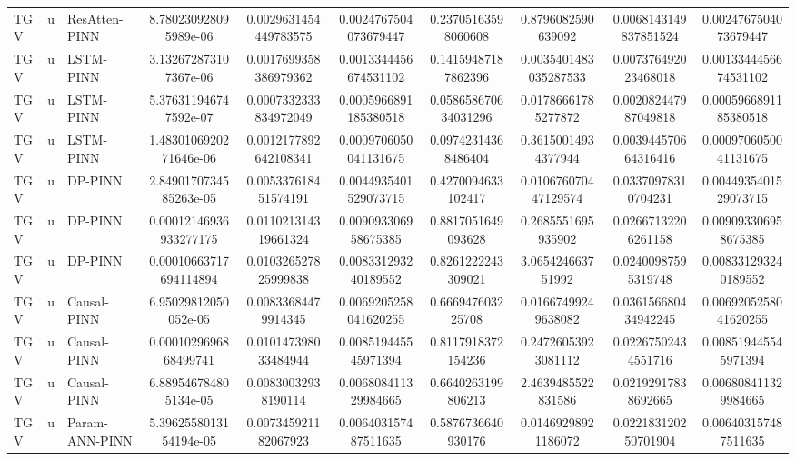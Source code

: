 \begin{landscape}
\begin{longtable}{lllccccccc}
 TGV &     u &  ResAtten-PINN &  8.780230928095989e-06 &  0.0029631454449783575 &  0.0024767504073679447 &  0.23705163598060608 &    0.8796082590639092 & 0.0068143149837851524 &  0.0024767504073679447 \\
 TGV &     u &      LSTM-PINN &  3.132672873107367e-06 &  0.0017699358386979362 &  0.0013344456674531102 &  0.14159487187862396 & 0.0035401483035287533 &  0.007376492023468018 &  0.0013344456674531102 \\
 TGV &     u &      LSTM-PINN &  5.376311946747592e-07 &  0.0007332333834972049 &  0.0005966891185380518 & 0.058658670634031296 &   0.01786661785277872 &  0.002082447987049818 &  0.0005966891185380518 \\
 TGV &     u &      LSTM-PINN & 1.4830106920271646e-06 &  0.0012177892642108341 &  0.0009706050041131675 &  0.09742314368486404 &   0.36150014934377944 &  0.003944570664316416 &  0.0009706050041131675 \\
 TGV &     u &        DP-PINN & 2.8490170734585263e-05 &   0.005337618451574191 &  0.0044935401529073715 &   0.4270094633102417 &  0.010676070447129574 &   0.03370978310704231 &  0.0044935401529073715 \\
 TGV &     u &        DP-PINN & 0.00012146936933277175 &   0.011021314319661324 &   0.009093306958675385 &   0.8817051649093628 &    0.2685551695935902 &   0.02667132206261158 &   0.009093306958675385 \\
 TGV &     u &        DP-PINN & 0.00010663717694114894 &   0.010326527825999838 &   0.008331293240189552 &   0.8261222243309021 &     3.065424663751992 &   0.02400987595319748 &   0.008331293240189552 \\
 TGV &     u &    Causal-PINN &   6.95029812050052e-05 &    0.00833684479914345 &  0.0069205258041620255 &    0.666947603225708 &   0.01667499249638082 &  0.036156680434942245 &  0.0069205258041620255 \\
 TGV &     u &    Causal-PINN &  0.0001029696868499741 &   0.010147398033484944 &   0.008519445545971394 &   0.8117918372154236 &   0.24726053923081112 &   0.02267502434551716 &   0.008519445545971394 \\
 TGV &     u &    Causal-PINN &  6.889546784805134e-05 &    0.00830032938190114 &   0.006808411329984665 &   0.6640263199806213 &    2.4639485522831586 &   0.02192917838692665 &   0.006808411329984665 \\
 TGV &     u & Param-ANN-PINN & 5.3962558013154194e-05 &   0.007345921182067923 &   0.006403157487511635 &   0.5876736640930176 &   0.01469298921186072 &  0.022183120250701904 &   0.006403157487511635 \\

\end{longtable}
\end{landscape}
